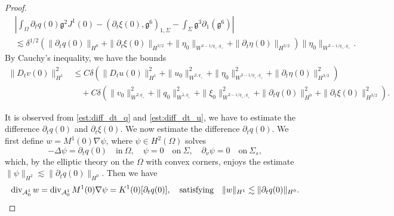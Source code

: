 \documentclass[letterpaper,reqno,10pt,twoside]{amsart}
\theoremstyle{definition}
\theoremstyle{remark}
\def\p{\partial}
\def\Om{\Omega}
\def\dive{\mathop{\rm div}\nolimits}
\begin{document}
\begin{appendix}
\begin{proof}
\begin{equation}
\begin{aligned}
						&\left|\int_\Om \p_tq(0)\mathfrak{g}^2J^1(0)-(\p_t\xi(0), \mathfrak{g}^6)_{1,\Sigma}-\int_\Sigma\mathfrak{g}^3\p_1(\mathfrak{g}^6)\right|\\
						&\lesssim \delta^{1/2}(\|\p_tq(0)\|_{H^0}+\|\p_t\xi(0)\|_{H^{3/2}}+\|\eta_0\|_{W^{3-1/q_+,q_+}}+\|\p_t\eta(0)\|_{H^{3/2}})\|\eta_0\|_{W^{3-1/q_+,q_+}}.
					\end{aligned}
				\end{equation}
				By Cauchy's inequality, we have the bounds
				\begin{equation}\label{est:diff_dt_u}
					\begin{aligned}
						\|D_tv(0)\|_{H^1}^2&\le C\delta(\|D_tu(0)\|_{H^1}^2+\|u_0\|_{W^{2,q_+}}^2+\|\eta_0\|_{W^{3-1/q_+,q_+}}^2+\|\p_t\eta(0)\|_{H^{3/2}}^2)\\
						&\quad+C\delta(\|v_0\|_{W^{2,q_+}}^2+\|q_0\|_{W^{1,q_+}}^2+\|\xi_0\|_{W^{3-1/q_+,q_+}}^2+\|\p_tq(0)\|_{H^0}^2+\|\p_t\xi(0)\|_{H^{3/2}}^2).
					\end{aligned}
				\end{equation}
				
				It is observed from \eqref{est:diff_dt_q} and \eqref{est:diff_dt_u}, we have to estimate the difference $\p_tq(0)$ and $\p_t\xi(0)$. We now estimate the difference $\p_tq(0)$. We first define $w=M^1(0)\nabla\psi$, where $\psi\in H^2(\Om)$ solves
				\[
				-\Delta\psi=\p_tq(0) \quad \text{in}\ \Om,\quad
				\psi=0 \quad \text{on}\ \Sigma,\quad
				\p_\nu\psi=0\quad \text{on}\ \Sigma_s,
				\]
				which, by the elliptic theory on the $\Om$ with convex corners, enjoys the estimate
				$\|\psi\|_{H^2}\lesssim \|\p_tq(0)\|_{H^0}$.
				Then we have
				\begin{equation}\label{eq:div_2}
					\dive_{\mathcal{A}^1_0}w=\dive_{\mathcal{A}^1_0}M^1(0)\nabla\psi=K^1(0)[\p_tq(0)],\quad \text{satisfying} \quad \|w\|_{H^1}\lesssim \|\p_tq(0)\|_{H^0}.
				\end{equation}
				

\end{proof}
\end{appendix}
\end{document}

